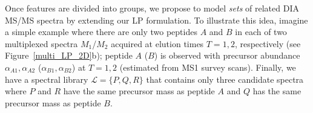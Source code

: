 \documentclass[arial,11pt]{article}
\begin{document}
Once features are divided into groups,  we propose to model {\em sets} of related DIA MS/MS spectra by extending our LP formulation.
%
To illustrate this idea, imagine a simple example where there are only two peptides $A$ and $B$ in each of two multiplexed spectra $M_{1}$/$M_{2}$ acquired at elution times $T=1,2$, respectively (see Figure~\ref{multi_LP_2D}b); peptide $A$ ($B$) is observed with precursor abundance $\alpha_{A1},\alpha_{A2}$ ($\alpha_{B1},\alpha_{B2}$) at $T=1,2$ (estimated from MS1 survey scans). Finally, we have a spectral library $\mathcal{L}=\{P,Q,R\}$ that contains only three candidate spectra where $P$ and $R$ have the same precursor mass as peptide $A$ and $Q$ has the same precursor mass as peptide $B$.
\end{document}
